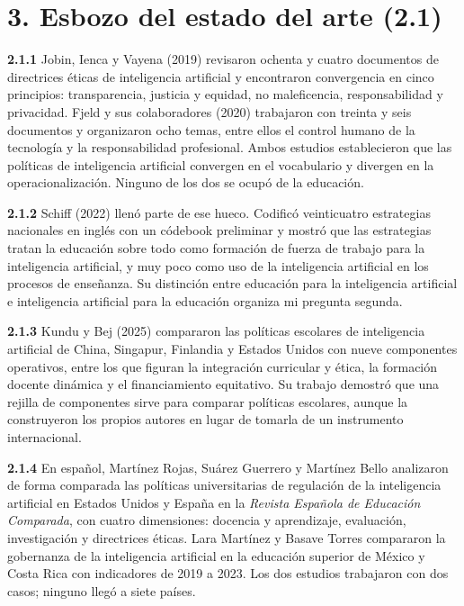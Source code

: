 \documentclass[12pt,letterpaper]{article}
\begin{document}
\section*{3. Esbozo del estado del arte (2.1)}

\textbf{2.1.1} Jobin, Ienca y Vayena (2019) revisaron ochenta y cuatro documentos de directrices
éticas de inteligencia artificial y encontraron convergencia en cinco principios: transparencia,
justicia y equidad, no maleficencia, responsabilidad y privacidad. Fjeld y sus colaboradores
(2020) trabajaron con treinta y seis documentos y organizaron ocho temas, entre ellos el control
humano de la tecnología y la responsabilidad profesional. Ambos estudios establecieron que las
políticas de inteligencia artificial convergen en el vocabulario y divergen en la
operacionalización. Ninguno de los dos se ocupó de la educación.

\textbf{2.1.2} Schiff (2022) llenó parte de ese hueco. Codificó veinticuatro estrategias
nacionales en inglés con un códebook preliminar y mostró que las estrategias tratan la educación
sobre todo como formación de fuerza de trabajo para la inteligencia artificial, y muy poco como
uso de la inteligencia artificial en los procesos de enseñanza. Su distinción entre educación
para la inteligencia artificial e inteligencia artificial para la educación organiza mi pregunta
segunda.

\textbf{2.1.3} Kundu y Bej (2025) compararon las políticas escolares de inteligencia artificial
de China, Singapur, Finlandia y Estados Unidos con nueve componentes operativos, entre los que
figuran la integración curricular y ética, la formación docente dinámica y el financiamiento
equitativo. Su trabajo demostró que una rejilla de componentes sirve para comparar políticas
escolares, aunque la construyeron los propios autores en lugar de tomarla de un instrumento
internacional.

\textbf{2.1.4} En español, Martínez Rojas, Suárez Guerrero y Martínez Bello analizaron de forma
comparada las políticas universitarias de regulación de la inteligencia artificial en Estados
Unidos y España en la \textit{Revista Española de Educación Comparada}, con cuatro dimensiones:
docencia y aprendizaje, evaluación, investigación y directrices éticas. Lara Martínez y Basave
Torres compararon la gobernanza de la inteligencia artificial en la educación superior de México
y Costa Rica con indicadores de 2019 a 2023. Los dos estudios trabajaron con dos casos; ninguno
llegó a siete países.
\end{document}
